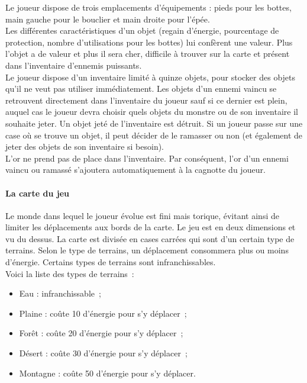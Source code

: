 \documentclass[11pt]{article}
\begin{document}
Le joueur dispose de trois emplacements d'équipements : pieds pour les bottes, main gauche pour le bouclier et main droite pour l'épée. \\
Les différentes caractéristiques d'un objet (regain d'énergie, pourcentage de protection, nombre d'utilisations pour les bottes) lui confèrent une valeur. Plus l'objet a de valeur et plus il sera cher, difficile à trouver sur la carte et présent dans l'inventaire d'ennemis puissants.\\
Le joueur dispose d'un inventaire limité à quinze objets, pour stocker des objets qu'il ne veut pas utiliser immédiatement. Les objets d'un ennemi vaincu se retrouvent directement dans l'inventaire du joueur sauf si ce dernier est plein, auquel cas le joueur devra choisir quels objets du monstre ou de son inventaire il souhaite jeter. Un objet jeté de l'inventaire est détruit. Si un joueur passe sur une case où se trouve un objet, il peut décider de le ramasser ou non (et également de jeter des objets de son inventaire si besoin).\\
L'or ne prend pas de place dans l'inventaire. Par conséquent, l'or d'un ennemi vaincu ou ramassé s'ajoutera automatiquement à la cagnotte du joueur.

\paragraph{La carte du jeu}

Le monde dans lequel le joueur évolue est fini mais torique, évitant ainsi de limiter les déplacements aux bords de la carte. Le jeu est en deux dimensions et vu du dessus. La carte est divisée en cases carrées qui sont d'un certain type de terrains. Selon le type de terrains, un déplacement consommera plus ou moins d'énergie. Certains types de terrains sont infranchissables.\\
Voici la liste des types de terrains~:

\begin{itemize}
   \item Eau : infranchissable~;
   \item Plaine : coûte 10 d'énergie pour s'y déplacer~;
   \item Forêt : coûte 20 d'énergie pour s'y déplacer~;
   \item Désert : coûte 30 d'énergie pour s'y déplacer~;
   \item Montagne : coûte 50 d'énergie pour s'y déplacer.
\end{itemize}
\end{document}
